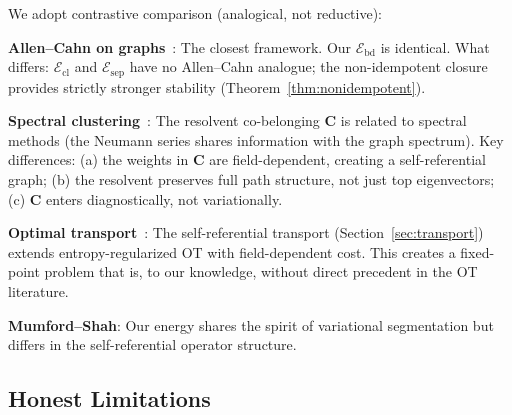 \documentclass[lettersize,journal]{IEEEtran}
\begin{document}
We adopt contrastive comparison (analogical, not reductive):

\textbf{Allen--Cahn on graphs}~\cite{vanGennip2012}: The closest framework. Our $\mathcal{E}_{\mathrm{bd}}$ is identical. What differs: $\mathcal{E}_{\mathrm{cl}}$ and $\mathcal{E}_{\mathrm{sep}}$ have no Allen--Cahn analogue; the non-idempotent closure provides strictly stronger stability (Theorem~\ref{thm:nonidempotent}).

\textbf{Spectral clustering}~\cite{ShiMalik2000}: The resolvent co-belonging $\mathbf{C}$ is related to spectral methods (the Neumann series shares information with the graph spectrum). Key differences: (a) the weights in $\mathbf{C}$ are field-dependent, creating a self-referential graph; (b) the resolvent preserves full path structure, not just top eigenvectors; (c) $\mathbf{C}$ enters diagnostically, not variationally.

\textbf{Optimal transport}~\cite{Peyre2019}: The self-referential transport (Section~\ref{sec:transport}) extends entropy-regularized OT with field-dependent cost. This creates a fixed-point problem that is, to our knowledge, without direct precedent in the OT literature.

\textbf{Mumford--Shah}: Our energy shares the spirit of variational segmentation but differs in the self-referential operator structure.

\subsection{Honest Limitations}
\end{document}
